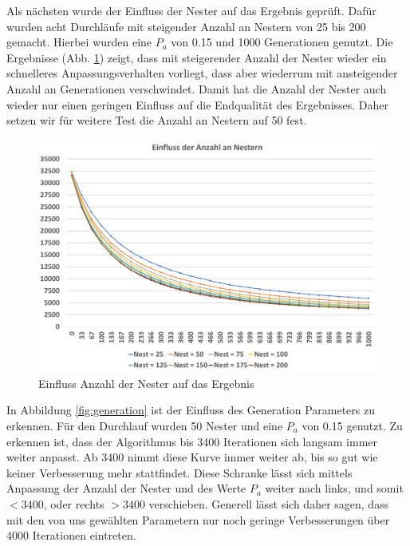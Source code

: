 \documentclass[conference]{IEEEtran}
\begin{document}
      Als nächsten wurde der Einfluss der Nester auf das Ergebnis geprüft. Dafür wurden acht Durchläufe mit steigender Anzahl an Nestern von 25 bis 200 
      gemacht. Hierbei wurden eine $P_a$ von 0.15 und 1000 Generationen genutzt. Die Ergebnisse (Abb. \ref{fig:nests}) zeigt, dass mit steigerender Anzahl der Nester wieder
      ein schnelleres Anpassungsverhalten vorliegt, dass aber wiederrum mit ansteigender Anzahl an Generationen verschwindet. Damit hat die Anzahl der Nester auch wieder
      nur einen geringen Einfluss auf die Endqualität des Ergebnisses. Daher setzen wir für weitere Test die Anzahl an Nestern auf 50 fest.
 

      \begin{figure}[H]
        \centering
        \includegraphics[width=0.8\linewidth]{Nester.png}
        \caption{Einfluss Anzahl der Nester auf das Ergebnis}
        \label{fig:nests}
      \end{figure}

      In Abbildung \ref{fig:generation} ist der Einfluss des Generation Parameters zu erkennen. Für den Durchlauf wurden 50 Nester und eine $P_a$ von 0.15 genutzt. 
      Zu erkennen ist, dass der Algorithmus bis 3400 Iterationen sich langsam immer weiter anpasst. Ab 3400 nimmt diese Kurve immer weiter ab, bis so gut wie keiner Verbesserung
      mehr stattfindet. Diese Schranke lässt sich mittels Anpassung der Anzahl der Nester und des Werte $P_a$ weiter nach links, und somit $<3400$, oder rechts $>3400$ verschieben.
      Generell lässt sich daher sagen, dass mit den von uns gewählten Parametern nur noch geringe Verbesserungen über 4000 Iterationen eintreten.
\end{document}
